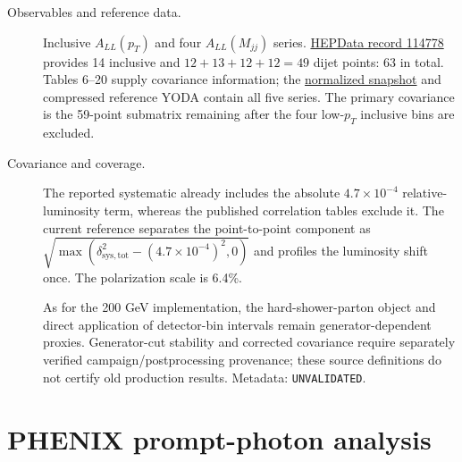 \documentclass[11pt,a4paper]{article}
\newcommand{\repolink}[2]{\href{https://github.com/apapaefs/HerwigPolarizedPheno/blob/78d1be3962c3e058409634af28dc9cd52dc9b77d/#1}{#2}}
\begin{document}
\begin{description}
\item[Observables and reference data.]
Inclusive $A_{LL}(p_T)$ and four $A_{LL}(M_{jj})$ series.
\href{https://doi.org/10.17182/hepdata.114778.v1}{HEPData record 114778}
provides 14 inclusive and $12+13+12+12=49$ dijet points: 63 in total.
Tables 6--20 supply covariance information; the
\repolink{data/phenomenology/STAR_2022_I1949588/reference.json}{normalized snapshot}
and compressed reference YODA contain all five series. The primary covariance is the 59-point submatrix
remaining after the four low-$p_T$ inclusive bins are excluded.
\item[Covariance and coverage.]
The reported systematic already includes the absolute $4.7\times10^{-4}$
relative-luminosity term, whereas the published correlation tables exclude
it. The current reference separates the point-to-point component as
$\sqrt{\max(\delta_{\mathrm{sys,tot}}^2-(4.7\times10^{-4})^2,0)}$
and profiles the luminosity shift once. The polarization scale is 6.4\%.

As for the 200 GeV implementation, the hard-shower-parton object and direct
application of detector-bin intervals remain generator-dependent proxies.
Generator-cut stability and corrected covariance require separately verified
campaign/postprocessing provenance; these source definitions do not certify
old production results. Metadata: \texttt{UNVALIDATED}.
\end{description}
\clearpage

\section{PHENIX prompt-photon analysis}
\end{document}
